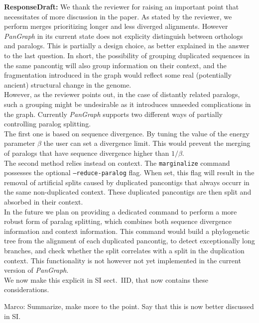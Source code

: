 \documentclass[aps,rmp,onecolumn]{revtex4-1}
\newcommand{\Marco}[1]{{\color{orange}Marco: #1}}
\newcommand{\responsedraft}[1]{{\it {\color{purple}\textbf{ResponseDraft:} #1}}\vskip 5mm}
\newcommand{\SIalgo}{II}
\begin{document}
\responsedraft{
We thank the reviewer for raising an important point that necessitates of more discussion in the paper.
As stated by the reviewer, we perform merges prioritizing longer and less diverged alignments. However \textit{PanGraph} in its current state does not explicity distinguish between orthologs and paralogs.
This is partially a design choice, as better explained in the answer to the last question. In short, the possibility of grouping duplicated sequences in the same pancontig will also group information on their context, and the fragmentation introduced in the graph would reflect some real (potentially ancient) structural change in the genome.\\

However, as the reviewer points out, in the case of distantly related paralogs, such a grouping might be undesirable as it introduces unneeded complications in the graph. Currently \textit{PanGraph} supports two different ways of partially controlling paralog splitting.\\
The first one is based on sequence divergence. By tuning the value of the energy parameter $\beta$ the user can set a divergence limit. This would prevent the merging of paralogs that have sequence divergence higher than $1/\beta$.\\
The second method relies instead on context. The \texttt{marginalize} command possesses the optional \texttt{--reduce-paralog} flag. When set, this flag will result in the removal of artificial splits caused by duplicated pancontigs that always occurr in the same non-duplicated context. These duplicated pancontigs are then split and absorbed in their context.\\

In the future we plan on providing a dedicated command to perform a more robust form of paralag splitting, which combines both sequence divergence information and context information. This command would build a phylogenetic tree from the alignment of each duplicated pancontig, to detect exceptionally long branches, and check whether the split correlates with a split in the duplication context. This functionality is not however not yet implemented in the current version of \textit{PanGraph}.\\

We now make this explicit in SI sect.~{\SIalgo}D, that now contains these considerations.

}
\Marco{Summarize, make more to the point. Say that this is now better discussed in SI.}
\end{document}
